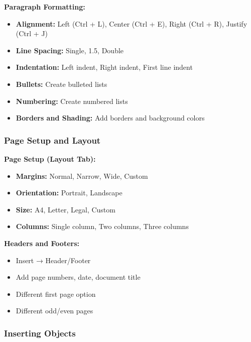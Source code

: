 \documentclass[12pt,a4paper]{article}
\begin{document}
\textbf{Paragraph Formatting:}
\begin{itemize}
    \item \textbf{Alignment:} Left (Ctrl + L), Center (Ctrl + E), Right (Ctrl + R), Justify (Ctrl + J)
    \item \textbf{Line Spacing:} Single, 1.5, Double
    \item \textbf{Indentation:} Left indent, Right indent, First line indent
    \item \textbf{Bullets:} Create bulleted lists
    \item \textbf{Numbering:} Create numbered lists
    \item \textbf{Borders and Shading:} Add borders and background colors
\end{itemize}

\subsubsection{Page Setup and Layout}

\textbf{Page Setup (Layout Tab):}
\begin{itemize}
    \item \textbf{Margins:} Normal, Narrow, Wide, Custom
    \item \textbf{Orientation:} Portrait, Landscape
    \item \textbf{Size:} A4, Letter, Legal, Custom
    \item \textbf{Columns:} Single column, Two columns, Three columns
\end{itemize}

\textbf{Headers and Footers:}
\begin{itemize}
    \item Insert → Header/Footer
    \item Add page numbers, date, document title
    \item Different first page option
    \item Different odd/even pages
\end{itemize}

\subsubsection{Inserting Objects}
\end{document}
